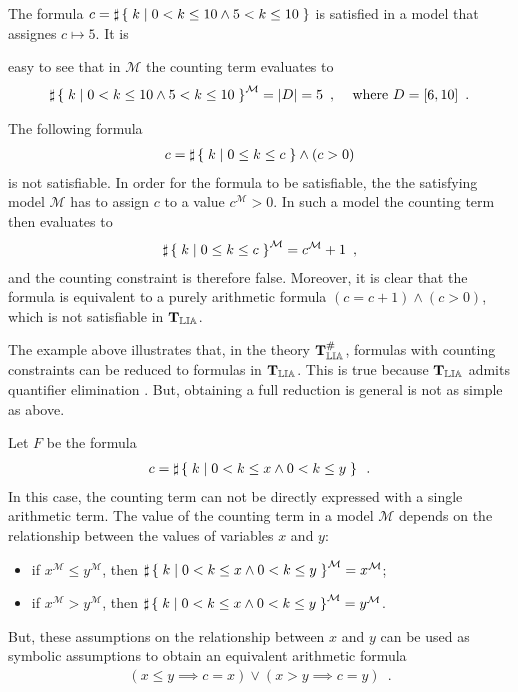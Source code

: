 \begin{example}
\label{ex:semantics}
The formula $c = \sharp\left\lbrace\;k\;|\;0 < k \le 10 \land 5 < k \le 10\;\right\rbrace$ is
satisfied in a model that assignes $c \mapsto 5$. It is

easy to see that in $\mathcal{M}$ the counting term evaluates to
\begin{align*}
  \sharp\left\lbrace\;k\;|\;0 < k \le 10 \land 5 < k \le 10\;\right\rbrace^\mathcal{M} = |D| = 5\enspace, &&
  \text{ where } D = [6, 10]\enspace.
\end{align*}

\end{example}

\begin{example}
\label{ex:simple}
The following formula
\begin{align*}
  c = \sharp\left\lbrace\;k\;|\;0 \le k \le c\;\right\rbrace \land (c > 0)
\end{align*}
is not satisfiable. In order for the formula to be satisfiable, the
the satisfying model $\mathcal{M}$ has to assign $c$ to a value
$c^\mathcal{M} > 0$. In such a model the counting term then evaluates to
\begin{align*}
  \sharp\left\lbrace\;k\;|\;0 \le k \le c\;\right\rbrace^\mathcal{M} = c^\mathcal{M} + 1\enspace,
\end{align*}
and the counting constraint is therefore false. Moreover, it
is clear that the formula is equivalent to a purely arithmetic
formula $(c=c+1) \land (c>0)$, which is not satisfiable in $\operatorname{\mathbf{T}_{\mathbb{LIA}}}$.
\end{example}

The example above illustrates that, in the theory $\operatorname{\mathbf{T}^\#_{\mathbb{LIA}}}$, formulas with
counting constraints can be reduced to formulas in $\operatorname{\mathbf{T}_{\mathbb{LIA}}}$. This is
true because $\operatorname{\mathbf{T}_{\mathbb{LIA}}}$ admits quantifier elimination \cite{schweikardt}.
But, obtaining a full reduction is general is not as simple as above.

\begin{example}
\label{ex:disjunction}
Let  $F$ be the formula
\begin{align*}
  c = \sharp\left\lbrace\;k\;|\;0 < k \le x \land 0 < k \le y\;\right\rbrace\enspace.
\end{align*}
In this case, the counting term can not be directly expressed with a
single arithmetic term. The value of the counting term
in a model $\mathcal{M}$ depends on the relationship between the values
of variables $x$ and $y$:
\begin{itemize}
  \item if $x^\mathcal{M} \le y^\mathcal{M}$, then $\sharp\left\lbrace\;k\;|\;0 < k \le x \land 0 < k \le y\;\right\rbrace^\mathcal{M} = x^\mathcal{M}$;
  \item if $x^\mathcal{M} > y^\mathcal{M}$, then $\sharp\left\lbrace\;k\;|\;0 < k \le x \land 0 < k \le y\;\right\rbrace^\mathcal{M} = y^\mathcal{M}$.
\end{itemize}
But, these assumptions on the relationship between $x$ and $y$ can
be used as symbolic assumptions to obtain an equivalent arithmetic
formula
\begin{align*}
  (x \le y \implies c = x) \lor (x > y \implies c = y)\enspace.
\end{align*}
\end{example}

